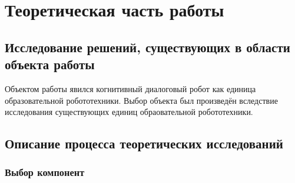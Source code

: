 \chapter{Теоретическая часть работы}

\section{Исследование решений, существующих в области объекта работы}

Объектом работы явился когнитивный диалоговый робот как единица образовательной робототехники. Выбор объекта был произведён вследствие исследования существующих единиц обраовательной робототехники.

\subsection{}

\section{Описание процесса теоретических исследований}
\subsection{Выбор компонент}
